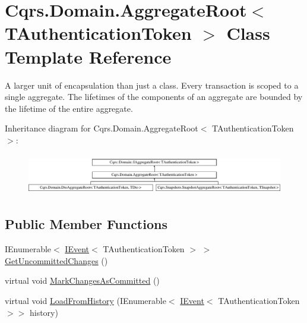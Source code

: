 \hypertarget{classCqrs_1_1Domain_1_1AggregateRoot}{}\section{Cqrs.\+Domain.\+Aggregate\+Root$<$ T\+Authentication\+Token $>$ Class Template Reference}
\label{classCqrs_1_1Domain_1_1AggregateRoot}


A larger unit of encapsulation than just a class. Every transaction is scoped to a single aggregate. The lifetimes of the components of an aggregate are bounded by the lifetime of the entire aggregate.  


Inheritance diagram for Cqrs.\+Domain.\+Aggregate\+Root$<$ T\+Authentication\+Token $>$\+:\begin{figure}[H]
\begin{center}
\leavevmode
\includegraphics[height=1.822126cm]{classCqrs_1_1Domain_1_1AggregateRoot}
\end{center}
\end{figure}
\subsection*{Public Member Functions}
\begin{DoxyCompactItemize}
\item 
I\+Enumerable$<$ \hyperlink{interfaceCqrs_1_1Events_1_1IEvent}{I\+Event}$<$ T\+Authentication\+Token $>$ $>$ \hyperlink{classCqrs_1_1Domain_1_1AggregateRoot_a625e885ec7885a686f729ed1efe3a8fa_a625e885ec7885a686f729ed1efe3a8fa}{Get\+Uncommitted\+Changes} ()
\item 
virtual void \hyperlink{classCqrs_1_1Domain_1_1AggregateRoot_adab968b830e186cb832583910bf6f3a6_adab968b830e186cb832583910bf6f3a6}{Mark\+Changes\+As\+Committed} ()
\item 
virtual void \hyperlink{classCqrs_1_1Domain_1_1AggregateRoot_aec873ad6e4c98309cad2d9f1c534aebb_aec873ad6e4c98309cad2d9f1c534aebb}{Load\+From\+History} (I\+Enumerable$<$ \hyperlink{interfaceCqrs_1_1Events_1_1IEvent}{I\+Event}$<$ T\+Authentication\+Token $>$$>$ history)
\end{DoxyCompactItemize}
